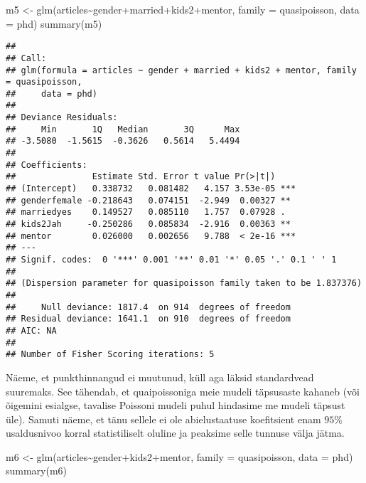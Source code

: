 \documentclass[
]{book}
\newenvironment{Shaded}{\begin{snugshade}}{\end{snugshade}}
\newcommand{\AttributeTok}[1]{\textcolor[rgb]{0.77,0.63,0.00}{#1}}
\newcommand{\FunctionTok}[1]{\textcolor[rgb]{0.00,0.00,0.00}{#1}}
\newcommand{\NormalTok}[1]{#1}
\newcommand{\OtherTok}[1]{\textcolor[rgb]{0.56,0.35,0.01}{#1}}
\newcommand{\SpecialCharTok}[1]{\textcolor[rgb]{0.00,0.00,0.00}{#1}}
\begin{document}
\begin{Shaded}
\begin{Highlighting}[]
\NormalTok{m5 }\OtherTok{\textless{}{-}} \FunctionTok{glm}\NormalTok{(articles}\SpecialCharTok{\textasciitilde{}}\NormalTok{gender}\SpecialCharTok{+}\NormalTok{married}\SpecialCharTok{+}\NormalTok{kids2}\SpecialCharTok{+}\NormalTok{mentor, }\AttributeTok{family =}\NormalTok{ quasipoisson, }\AttributeTok{data =}\NormalTok{ phd)}
\FunctionTok{summary}\NormalTok{(m5)}
\end{Highlighting}
\end{Shaded}

\begin{verbatim}
## 
## Call:
## glm(formula = articles ~ gender + married + kids2 + mentor, family = quasipoisson, 
##     data = phd)
## 
## Deviance Residuals: 
##     Min       1Q   Median       3Q      Max  
## -3.5080  -1.5615  -0.3626   0.5614   5.4494  
## 
## Coefficients:
##               Estimate Std. Error t value Pr(>|t|)    
## (Intercept)   0.338732   0.081482   4.157 3.53e-05 ***
## genderfemale -0.218643   0.074151  -2.949  0.00327 ** 
## marriedyes    0.149527   0.085110   1.757  0.07928 .  
## kids2Jah     -0.250286   0.085834  -2.916  0.00363 ** 
## mentor        0.026000   0.002656   9.788  < 2e-16 ***
## ---
## Signif. codes:  0 '***' 0.001 '**' 0.01 '*' 0.05 '.' 0.1 ' ' 1
## 
## (Dispersion parameter for quasipoisson family taken to be 1.837376)
## 
##     Null deviance: 1817.4  on 914  degrees of freedom
## Residual deviance: 1641.1  on 910  degrees of freedom
## AIC: NA
## 
## Number of Fisher Scoring iterations: 5
\end{verbatim}

Näeme, et punkthinnangud ei muutunud, küll aga läksid standardvead suuremaks. See tähendab, et quaipoissoniga meie mudeli täpsusaste kahaneb (või õigemini esialgse, tavalise Poissoni mudeli puhul hindasime me mudeli täpsust üle). Samuti näeme, et tänu sellele ei ole abielustaatuse koefitsient enam \(95\%\) usaldusnivoo korral statistiliselt oluline ja peaksime selle tunnuse välja jätma.

\begin{Shaded}
\begin{Highlighting}[]
\NormalTok{m6 }\OtherTok{\textless{}{-}} \FunctionTok{glm}\NormalTok{(articles}\SpecialCharTok{\textasciitilde{}}\NormalTok{gender}\SpecialCharTok{+}\NormalTok{kids2}\SpecialCharTok{+}\NormalTok{mentor, }\AttributeTok{family =}\NormalTok{ quasipoisson, }\AttributeTok{data =}\NormalTok{ phd)}
\FunctionTok{summary}\NormalTok{(m6)}
\end{Highlighting}
\end{Shaded}
\end{document}
